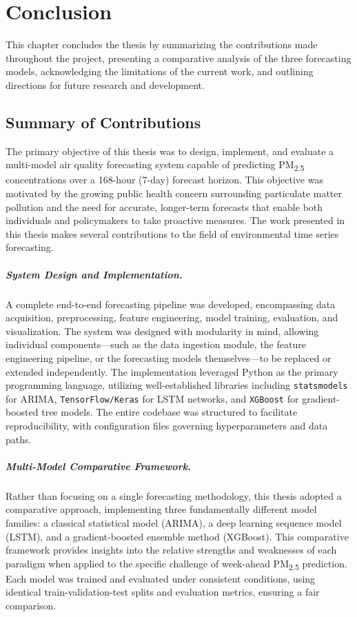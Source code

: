 \chapter{Conclusion}
\label{ch:sum}

This chapter concludes the thesis by summarizing the contributions made throughout the project, presenting a comparative analysis of the three forecasting models, acknowledging the limitations of the current work, and outlining directions for future research and development.

\section{Summary of Contributions}
\label{sec:sum-contributions}

The primary objective of this thesis was to design, implement, and evaluate a multi-model air quality forecasting system capable of predicting PM\textsubscript{2.5} concentrations over a 168-hour (7-day) forecast horizon. This objective was motivated by the growing public health concern surrounding particulate matter pollution and the need for accurate, longer-term forecasts that enable both individuals and policymakers to take proactive measures. The work presented in this thesis makes several contributions to the field of environmental time series forecasting.

\paragraph{System Design and Implementation.}
A complete end-to-end forecasting pipeline was developed, encompassing data acquisition, preprocessing, feature engineering, model training, evaluation, and visualization. The system was designed with modularity in mind, allowing individual components---such as the data ingestion module, the feature engineering pipeline, or the forecasting models themselves---to be replaced or extended independently. The implementation leveraged Python as the primary programming language, utilizing well-established libraries including \texttt{statsmodels} for ARIMA, \texttt{TensorFlow/Keras} for LSTM networks, and \texttt{XGBoost} for gradient-boosted tree models. The entire codebase was structured to facilitate reproducibility, with configuration files governing hyperparameters and data paths.

\paragraph{Multi-Model Comparative Framework.}
Rather than focusing on a single forecasting methodology, this thesis adopted a comparative approach, implementing three fundamentally different model families: a classical statistical model (ARIMA), a deep learning sequence model (LSTM), and a gradient-boosted ensemble method (XGBoost). This comparative framework provides insights into the relative strengths and weaknesses of each paradigm when applied to the specific challenge of week-ahead PM\textsubscript{2.5} prediction. Each model was trained and evaluated under consistent conditions, using identical train-validation-test splits and evaluation metrics, ensuring a fair comparison.

